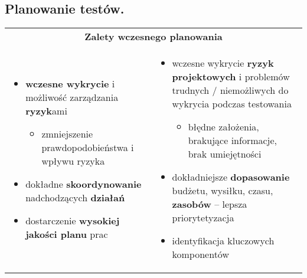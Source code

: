\documentclass[../main.tex]{subfiles}
\begin{document}
    \subsection{Planowanie testów.}

    \begin{table}[H]
        \begin{center}
            \begin{tabular}{ p{8cm}  p{8cm} }
                \multicolumn{2}{c}{ \textbf{Zalety wczesnego planowania}}\\
                \begin{itemize}
                    \item \textbf{wczesne wykrycie} i możliwość zarządzania \textbf{ryzyk}ami
                    \begin{itemize}
                        \item zmniejszenie prawdopodobieństwa i wpływu ryzyka
                    \end{itemize}
                    \item dokładne \textbf{skoordynowanie} nadchodzących \textbf{działań}
                    \item dostarczenie \textbf{wysokiej jakości planu} prac
                \end{itemize}
                &
                \begin{itemize}
                    \item wczesne wykrycie \textbf{ryzyk projektowych} i problemów trudnych /
                    niemożliwych do wykrycia podczas testowania
                    \begin{itemize}
                        \item błędne założenia, brakujące informacje, brak umiejętności
                    \end{itemize}
                    \item dokładniejsze \textbf{dopasowanie} budżetu, wysiłku, czasu, \textbf{zasobów} – lepsza priorytetyzacja
                    \item identyfikacja kluczowych komponentów
                \end{itemize}\\
            \end{tabular}
        \end{center}
    \end{table}
\end{document}
